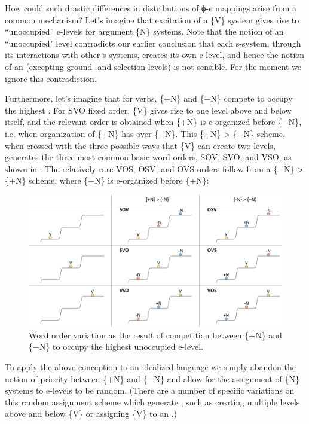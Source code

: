   How could such drastic differences in distributions of ϕ{}-e mappings arise from a common mechanism? Let's imagine that excitation of a \{V\} system gives rise to “unoccupied” e-levels for argument \{N\} systems. Note that the notion of an “unoccupied" level contradicts our earlier conclusion that each s-system, through its interactions with other s-systems, creates its own e-level, and hence the notion of an  (excepting ground- and selection-levels) is not sensible. For the moment we ignore this contradiction.

  Furthermore, let's imagine that for  verbs, \{+N\} and \{−N\} compete to occupy the highest . For SVO fixed order, \{V\} gives rise to one level above and below itself, and the relevant order is obtained when \{+N\} is e-organized before \{−N\}, i.e. when organization of \{+N\} has  over \{−N\}. This \{+N\} > \{−N\} scheme, when crossed with the three possible ways that \{V\} can create two levels, generates the three most common basic word orders, SOV, SVO, and VSO, as shown in {}. The relatively rare VOS, OSV, and OVS orders follow from a \{−N\} > \{+N\} scheme, where \{−N\} is e-organized before \{+N\}:

  
\begin{figure}
\includegraphics[width=\textwidth]{figures/Tilsen-img75.png}
\caption{Word order variation as the result of competition between \{+N\} and \{−N\} to occupy the highest unoccupied e-level.}
\label{fig:4:25}
\end{figure}
 

  To apply the above conception to an idealized  language we simply abandon the notion of priority between \{+N\} and \{−N\} and allow for the assignment of \{N\} systems to e-levels to be random. (There are a number of specific variations on this random assignment scheme which generate , such as creating multiple levels above and below \{V\} or assigning \{V\} to an .)

